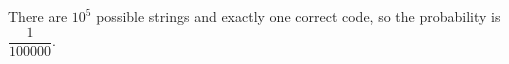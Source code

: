 There are $10^5$ possible strings and exactly one correct code, so the probability is $\boxed{\dfrac{1}{100000}}$.
